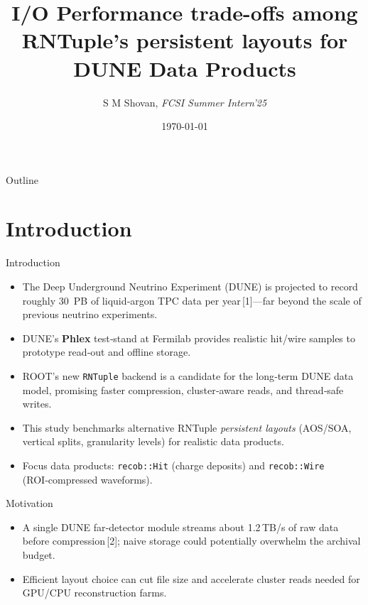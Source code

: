 \documentclass[aspectratio=169]{beamer}
\title{I/O Performance trade-offs among RNTuple’s persistent layouts for DUNE Data Products}
\subtitle{}
\author{S M Shovan, \textit{FCSI Summer Intern'25}}
\institute{Fermi National Accelerator Laboratory}
\date{\today}
\begin{document}
\maketitle


\begin{frame}{Outline}
\tableofcontents
\end{frame}

\section{Introduction}

\begin{frame}{Introduction}
  \begin{itemize}
    \item The Deep Underground Neutrino Experiment (DUNE) is projected to record roughly 30~PB of liquid‑argon TPC data per year\,[1]—far beyond the scale of previous neutrino experiments.
    \item DUNE’s \textbf{Phlex} test‑stand at Fermilab provides realistic hit/wire samples to prototype read‑out and offline storage.
    \item ROOT’s new \texttt{RNTuple} backend is a candidate for the long‑term DUNE data model, promising faster compression, cluster‑aware reads, and thread‑safe writes.
    \item This study benchmarks alternative RNTuple \emph{persistent layouts} (AOS/SOA, vertical splits, granularity levels) for realistic data products.
    \item Focus data products: \texttt{recob::Hit} (charge deposits) and \texttt{recob::Wire} (ROI‑compressed waveforms).
  \end{itemize}
\end{frame}

\begin{frame}{Motivation}
  \begin{itemize}
    \item A single DUNE far‑detector module streams about 1.2\,TB/s of raw data before compression\,[2]; naive storage could potentially overwhelm the archival budget.

    \vspace{2em}

    \item Efficient layout choice can cut file size and accelerate cluster reads needed for GPU/CPU reconstruction farms.
  \end{itemize}
\end{frame}
\end{document}
